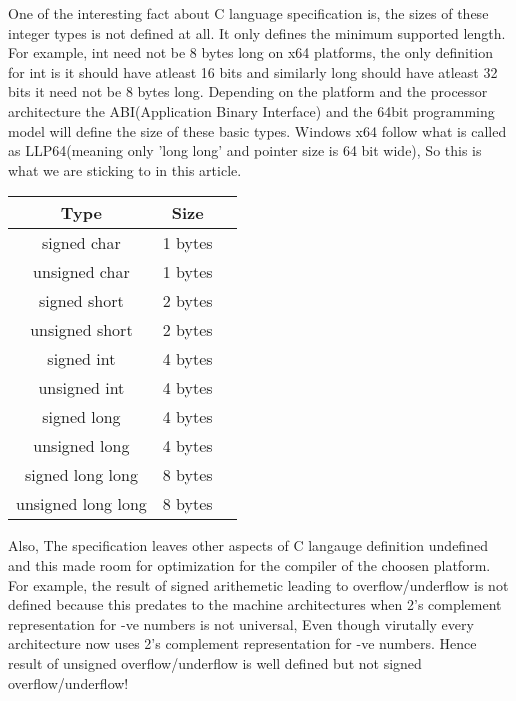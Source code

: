 \documentclass{article}
\begin{document}
One of the interesting fact about C language specification is, the sizes of
these integer types is not defined at all. It only defines the minimum supported
length. For example, int need not be 8 bytes long on x64 platforms, the only
definition for int is it should have atleast 16 bits and similarly long should
have atleast 32 bits it need not be 8 bytes long. Depending on the platform
and the processor architecture the ABI(Application Binary Interface) and the
64bit programming model will define the size of these basic types. Windows x64
follow what is called as LLP64(meaning only 'long long' and pointer size is 64
bit wide), So this is what we are sticking to in this article.

\begin{center}
\begin{tabular}{|c|c|c|}
 Type       &Size       \\
 \hline               
 signed char         & 1 bytes \\
 unsigned char       & 1 bytes \\
 signed short        & 2 bytes \\
 unsigned short      & 2 bytes \\
 signed int          & 4 bytes \\
 unsigned int        & 4 bytes \\
 signed long         & 4 bytes \\
 unsigned long       & 4 bytes \\
 signed long long    & 8 bytes \\
 unsigned long long  & 8 bytes
\end{tabular}
\end{center}

Also, The specification leaves other aspects of C langauge definition undefined
and this made room for optimization for the compiler of the choosen platform.
For example, the result of signed arithemetic leading to overflow/underflow is
not defined because this predates to the machine architectures when 2's
complement representation for -ve numbers is not universal, Even though
virutally every architecture now uses 2's complement representation for -ve
numbers. Hence result of unsigned overflow/underflow is well defined but not
signed overflow/underflow!
\end{document}
